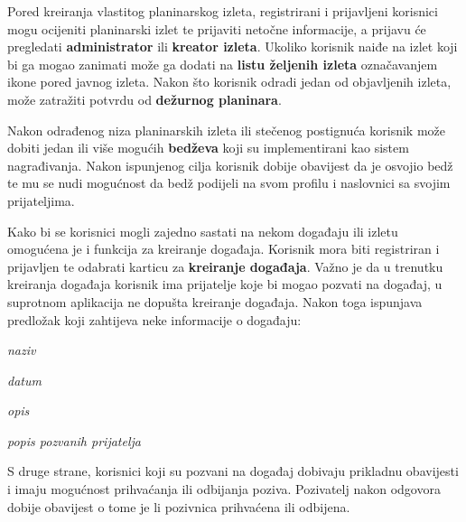 Pored kreiranja vlastitog planinarskog izleta, registrirani i prijavljeni korisnici mogu ocijeniti planinarski izlet te prijaviti netočne informacije, a prijavu će pregledati \textbf{administrator} ili \textbf{kreator izleta}. Ukoliko korisnik naiđe na izlet koji bi ga mogao zanimati može ga dodati na \textbf{listu željenih izleta} označavanjem ikone pored javnog izleta.
Nakon što korisnik odradi jedan od objavljenih izleta, može zatražiti potvrdu od \textbf{dežurnog planinara}. \vspace{10pt}

Nakon odrađenog niza planinarskih izleta ili stečenog postignuća korisnik može dobiti jedan ili više mogućih \textbf{bedževa} koji su implementirani kao sistem nagrađivanja. Nakon ispunjenog cilja korisnik dobije obavijest da je osvojio bedž te mu se nudi mogućnost da bedž podijeli na svom profilu i naslovnici sa svojim prijateljima. 
\vspace{10pt}

Kako bi se korisnici mogli zajedno sastati na nekom događaju ili izletu omogućena je i funkcija za kreiranje događaja. Korisnik mora biti registriran i prijavljen te odabrati karticu za \textbf{kreiranje događaja}. Važno je da u trenutku kreiranja događaja korisnik ima prijatelje koje bi mogao pozvati na događaj, u suprotnom aplikacija ne dopušta kreiranje događaja. Nakon toga ispunjava predložak koji zahtijeva neke informacije o događaju:

\begin{packed_item}
			\item \textit {naziv }
			\item \textit{datum}
			\item \textit{opis}
			\item \textit{popis pozvanih prijatelja}
\end{packed_item} 

S druge strane, korisnici koji su pozvani na događaj dobivaju prikladnu obavijesti i imaju mogućnost prihvaćanja ili odbijanja poziva. Pozivatelj nakon odgovora dobije obavijest o tome je li pozivnica prihvaćena ili odbijena.